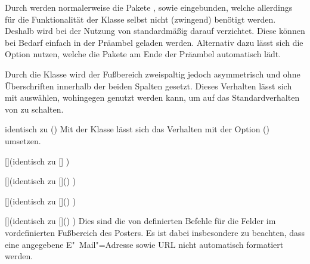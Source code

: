 \begin{DeclareEntity}{}
\begin{Declaration}{}
\printdeclarationlist%
%
Durch  werden normalerweise die Pakete , 
 sowie  eingebunden, welche allerdings für 
die Funktionalität der Klasse selbst nicht (zwingend) benötigt werden. Deshalb 
wird bei der Nutzung von  standardmäßig darauf verzichtet. 
Diese können bei Bedarf einfach in der Präambel geladen werden. Alternativ 
dazu 
lässt sich die Option  nutzen, welche die Pakete am Ende 
der Präambel automatisch lädt.
\end{Declaration}

\begin{Declaration}{}%
\printdeclarationlist%
%
Durch die Klasse  wird der Fußbereich zweispaltig jedoch 
asymmetrisch und ohne Überschriften innerhalb der beiden Spalten gesetzt. 
Dieses Verhalten lässt sich mit  auswählen, wohingegen 
 genutzt werden kann, um auf das Standardverhalten 
von  zu schalten.
\end{Declaration}

\begin{Declaration}{}{%
  identisch zu ()%
}
\printdeclarationlist%
%
Mit der Klasse  lässt sich das Verhalten mit der Option 
() umsetzen.
\end{Declaration}

\begin{Declaration}{[]}(identisch zu 
  []%
)
\begin{Declaration}{[]}(identisch zu 
  []()%
)
\begin{Declaration}{[]}(identisch zu 
  []()%
)
\begin{Declaration}{[]}(identisch zu 
  []()%
)
\printdeclarationlist%
%
Dies sind die von  definierten Befehle für die Felder im 
vordefinierten Fußbereich des Posters. Es ist dabei insbesondere zu beachten, 
dass eine angegebene E"~Mail"=Adresse sowie URL nicht automatisch formatiert 
werden.
\end{Declaration}
\end{Declaration}
\end{Declaration}
\end{Declaration}


\end{DeclareEntity}
